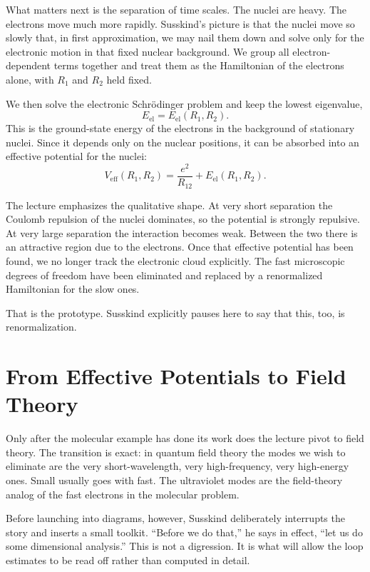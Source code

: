 What matters next is the separation of time scales. The nuclei are heavy. The electrons move much more rapidly. Susskind's picture is that the nuclei move so slowly that, in first approximation, we may nail them down and solve only for the electronic motion in that fixed nuclear background. We group all electron-dependent terms together and treat them as the Hamiltonian of the electrons alone, with \(R_1\) and \(R_2\) held fixed.

We then solve the electronic Schr\"odinger problem and keep the lowest eigenvalue,
\begin{equation}
E_{\mathrm{el}}=E_{\mathrm{el}}(R_1,R_2).
\end{equation}
This is the ground-state energy of the electrons in the background of stationary nuclei. Since it depends only on the nuclear positions, it can be absorbed into an effective potential for the nuclei:
\begin{equation}
V_{\mathrm{eff}}(R_1,R_2)=\frac{e^2}{R_{12}}+E_{\mathrm{el}}(R_1,R_2).
\end{equation}

The lecture emphasizes the qualitative shape. At very short separation the Coulomb repulsion of the nuclei dominates, so the potential is strongly repulsive. At very large separation the interaction becomes weak. Between the two there is an attractive region due to the electrons. Once that effective potential has been found, we no longer track the electronic cloud explicitly. The fast microscopic degrees of freedom have been eliminated and replaced by a renormalized Hamiltonian for the slow ones.

That is the prototype. Susskind explicitly pauses here to say that this, too, is renormalization.

\section{From Effective Potentials to Field Theory}

Only after the molecular example has done its work does the lecture pivot to field theory. The transition is exact: in quantum field theory the modes we wish to eliminate are the very short-wavelength, very high-frequency, very high-energy ones. Small usually goes with fast. The ultraviolet modes are the field-theory analog of the fast electrons in the molecular problem.

Before launching into diagrams, however, Susskind deliberately interrupts the story and inserts a small toolkit. ``Before we do that,'' he says in effect, ``let us do some dimensional analysis.'' This is not a digression. It is what will allow the loop estimates to be read off rather than computed in detail.


